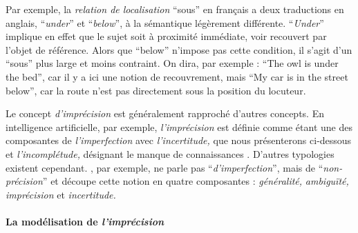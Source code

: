 Par exemple, la \emph{relation de localisation} \enquote{sous} en
français a deux traductions en anglais,
\foreignquote{english}{\emph{under}} et
\foreignquote{english}{\emph{below}}, à la sémantique légèrement
différente. \foreignquote{english}{\emph{Under}} implique en effet que
le sujet soit à proximité immédiate, voir recouvert par l'objet de
référence. Alors que \foreignquote{english}{below} n'impose pas cette
condition, il s'agit d'un \enquote{sous} plus large et moins
contraint. On dira, par exemple : \foreignquote{english}{The owl is
  under the bed}, car il y a ici une notion de recouvrement, mais
\foreignquote{english}{My car is in the street below}, car la route
n'est pas directement sous la position du locuteur.

Le concept \emph{d'imprécision} est généralement rapproché d'autres
concepts. En intelligence artificielle, par exemple,
\emph{l'imprécision} est définie comme étant une des composantes de
\emph{l'imperfection} avec \emph{l'incertitude,} que nous présenterons
ci-dessous et \emph{l'incomplétude,} désignant le manque de
connaissances
\autocite{Bouchon-Meunier1995,Bouchon-Meunier2007}. D'autres
typologies existent cependant. \textcite{Niskanen1989}, par exemple,
ne parle pas \enquote{\emph{d'imperfection}}, mais de
\enquote{\emph{non-précision}} et découpe cette notion en quatre
composantes : \emph{généralité,} \emph{ambiguïté,} \emph{imprécision}
et \emph{incertitude.}

\paragraph{La modélisation de \emph{l'imprécision}}

